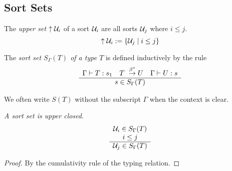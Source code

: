 \begin{comment}
            We reduce the rightmost redex of degree d and claim that this
            reduces n by one. We continue until n=0 i.e. there are no more
            redexes of degree d.

            We continue this process until there are no more redexes of level i.

            The i-normal term is unique because the rightmost redex is unique.
            Therefore we have found the reduction function ri.

        Crucial in the construction: The reduction of the rightmost redex of the
        highest degree does not make new redexes of this degree.
\end{comment}








\subsection{Sort Sets}


\begin{definition}
    \label{def:UpperSet}
    The \emph{upper set} ${\uparrow {\cal U}_i}$ of a sort ${\cal U}_i$ are all sorts
    ${\cal U}_j$ where $i \le j$.
    $$
    {\uparrow {\cal U}_i} := {\left\{{\cal U}_j \mid i \le j\right\}}
    $$
\end{definition}




\begin{definition}
    \label{def:SortSet}
    The \emph{sort set $S_\Gamma(T)$ of a type $T$} is defined inductively by
    the rule
    $$
    \ruleh{
        \Gamma \vdash T : s_1\quad
        T \reducestar U\quad
        \Gamma \vdash U : s
    }
    {
        s \in S_\Gamma(T)
    }
    $$

    We often write $S(T)$ without the subscript $\Gamma$ when the context is
    clear.
\end{definition}





\begin{theorem}
    \label{thm:SortSetUpperClosed}
    \emph{A sort set is upper closed}.
    $$
        \begin{array}{c} 
            {\cal U}_i \in S_\Gamma(T)
            \\
            i \le j
         \\ \hline 
            {\cal U}_j \in S_\Gamma(T)
        \end{array}
    $$
    \begin{proof}
        By the cumulativity rule of the typing relation.
    \end{proof}
\end{theorem}






